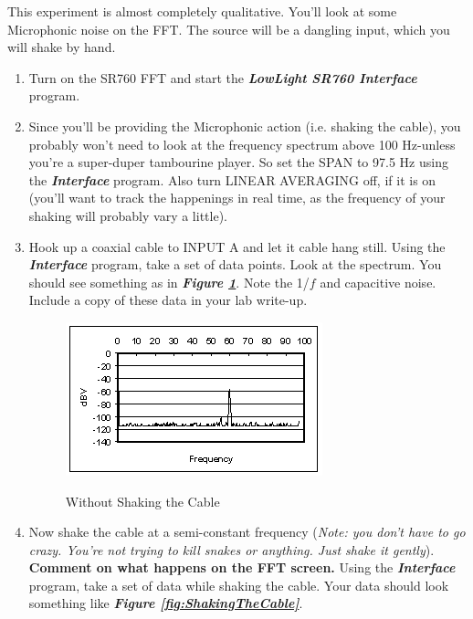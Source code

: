\documentclass{../lab}
\begin{document}
This experiment is almost completely qualitative. You'll look at some Microphonic noise on the FFT. The source will be a dangling input, which you will shake by hand.

\begin{enumerate}
    \item Turn on the SR760 FFT and start the \emph{\textbf{LowLight SR760 Interface}} program.

    \item Since you'll be providing the Microphonic action (i.e. shaking the cable), you probably won't need to look at the frequency spectrum above 100 Hz-unless you're a super-duper tambourine player. So set the SPAN to 97.5 Hz using the \emph{\textbf{Interface}} program. Also turn LINEAR AVERAGING off, if it is on (you'll want to track the happenings in real time, as the frequency of your shaking will probably vary a little).

    \item Hook up a coaxial cable to INPUT A and let it cable hang still. Using the \emph{\textbf{Interface}} program, take a set of data points. Look at the spectrum. You should see something as in \emph{\textbf{Figure \ref{fig:WithoutShakingTheCable}}}. Note the 1/$f$ and capacitive noise. Include a copy of these data in your lab write-up.

    \begin{figure}[h]
        \centering
        \href{http://experimentationlab.berkeley.edu/sites/default/files/images/LLSimage025.gif}{\includegraphics[width=0.5\linewidth]{images/LLSimage025.png}}
        \caption{Without Shaking the Cable}
        \label{fig:WithoutShakingTheCable}
    \end{figure}

    \item Now shake the cable at a semi-constant frequency (\emph{Note: you don't have to go crazy. You're not trying to kill snakes or anything. Just shake it gently}). \textbf{Comment on what happens on the FFT screen.} Using the \emph{\textbf{Interface}} program, take a set of data while shaking the cable. Your data should look something like \emph{\textbf{Figure \ref{fig:ShakingTheCable}}}.


\end{enumerate}
\end{document}
